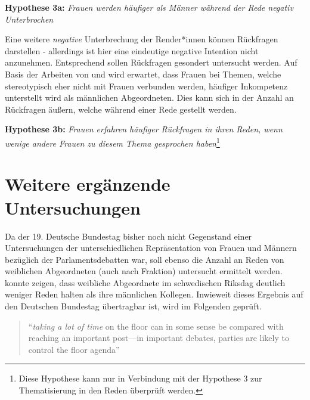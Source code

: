\documentclass[12pt, 
    twoside=false, 
    bibliography=totoc, 
    numbers=endperiod, 
    headings=normal, 
    toc=chapterentrydotfill
    ]{scrbook}
\begin{document}
\textbf{Hypothese 3a:} \emph{Frauen werden häufiger als Männer während der Rede negativ Unterbrochen}

Eine weitere \emph{negative} Unterbrechung der Render*innen können Rückfragen darstellen - allerdings ist hier eine eindeutige negative Intention nicht anzunehmen. Entsprechend sollen Rückfragen gesondert untersucht werden. Auf Basis der Arbeiten von \textcite{brescoll_2011} und \textcite{eagly_2002} wird erwartet, dass Frauen bei Themen, welche stereotypisch eher nicht mit Frauen verbunden werden, häufiger Inkompetenz unterstellt wird als männlichen Abgeordneten. Dies kann sich in der Anzahl an Rückfragen äußern, welche während einer Rede gestellt werden. 

\textbf{Hypothese 3b:} \emph{Frauen erfahren häufiger Rückfragen in ihren Reden, wenn wenige andere Frauen zu diesem Thema gesprochen haben}\footnote{Diese Hypothese kann nur in Verbindung mit der Hypothese 3 zur Thematisierung in den Reden überprüft werden.}

\section{Weitere ergänzende Untersuchungen}

Da der 19. Deutsche Bundestag bisher noch nicht Gegenstand einer Untersuchungen der unterschiedlichen Repräsentation von Frauen und Männern bezüglich der Parlamentsdebatten war, soll ebenso die Anzahl an Reden von weiblichen Abgeordneten (auch nach Fraktion) untersucht ermittelt werden. \textcite{back_2014} konnte zeigen, dass weibliche Abgeordnete im schwedischen Riksdag deutlich weniger Reden halten als ihre männlichen Kollegen. Inwieweit dieses Ergebnis auf den Deutschen Bundestag übertragbar ist, wird im Folgenden geprüft.

\citereset
\begin{quote}
     \enquote{\emph{taking a lot of time} on the floor can in some sense be compared with reaching an important post—in important debates, parties are likely to control the floor agenda} \parencites[507]{back_2014}
\end{quote}
\end{document}
